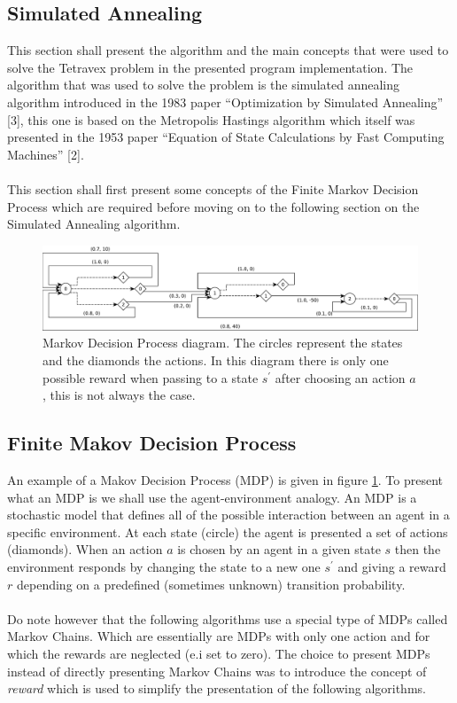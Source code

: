 \documentclass[11pt]{article}
\begin{document}
\begin{multicols*}{2}
\section{Simulated Annealing}
This section shall present the algorithm and the main concepts that were used to
solve the Tetravex problem in the presented program implementation. The
algorithm that was used to solve the problem is the simulated annealing
algorithm introduced in the 1983 paper ``Optimization by Simulated Annealing'' [3],
this one is based on the Metropolis Hastings algorithm which itself was
presented in the 1953 paper ``Equation of State Calculations by Fast Computing
Machines'' [2].\\\\ This section shall first present some concepts of the Finite
Markov Decision Process which are required before moving on to the following
section on the Simulated Annealing algorithm.
\begin{figure}[t]
  \centering
  \includegraphics[width=\linewidth]{image/mdp.pdf}
  \caption{Markov Decision Process diagram. The circles represent the states
    and the diamonds the actions. In this diagram there is only one possible
    reward when passing to a state $s^\prime$ after choosing an action $a$,
    this is not always the case.}
  \label{fig:mdp}
\end{figure}
\subsection{Finite Makov Decision Process}
\noindent An example of a Makov Decision Process (MDP) is given in figure
\ref{fig:mdp}. To present what an MDP is we shall use the agent-environment
analogy. An MDP is a stochastic model that defines all of the possible
interaction between an agent in a specific environment. At each state (circle)
the agent is presented a set of actions (diamonds). When an action $a$ is chosen
by an agent in a given state $s$ then the environment responds by changing the
state to a new one $s^\prime$ and giving a reward $r$ depending on a predefined
(sometimes unknown) transition probability.\\\\ Do note however that the
following algorithms use a special type of MDPs called Markov Chains. Which are
essentially are MDPs with only one action and for which the rewards are
neglected (e.i set to zero). The choice to present MDPs instead of directly
presenting Markov Chains was to introduce the concept of \textit{reward} which
is used to simplify the presentation of the following algorithms.

\end{multicols*}
\end{document}

